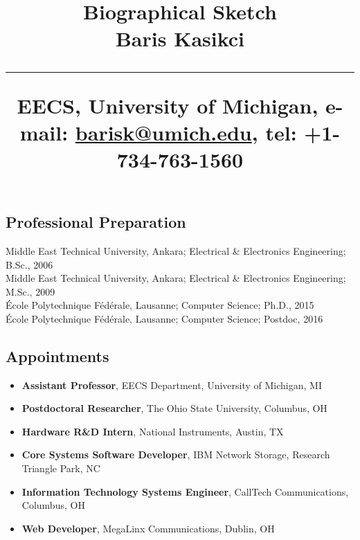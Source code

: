 \documentclass[svgnames,11pt]{article}
\title{%
        \vspace{-2\baselineskip}
            \normalsize
            Biographical Sketch\\
            {\large\textbf{Baris Kasikci}}\\
            \vspace{0.5\baselineskip}
            \hrule
            \vspace{0.5\baselineskip}
            EECS, University of Michigan,
            e-mail: \href{mailto:barisk@umich.edu}{barisk@umich.edu},
            tel: +1-734-763-1560
        \vspace{-1.5ex}
        }
\date{}
\author{}
\begin{document}
\maketitle
\vspace{-4\baselineskip}

\subsection{Professional Preparation}

    Middle East Technical University, Ankara;
        Electrical \& Electronics Engineering;
        B.Sc., 2006
        \\
    Middle East Technical University, Ankara;
        Electrical \& Electronics Engineering;
        M.Sc., 2009
        \\
    \'Ecole Polytechnique F\'ed\'erale, Lausanne;
        Computer Science;
        Ph.D., 2015
        \\
    \'Ecole Polytechnique F\'ed\'erale, Lausanne;
        Computer Science;
        Postdoc, 2016


\subsection{Appointments}

\begin{itemize}[label={--9999:},leftmargin=*,itemsep=0pt]

    \item[2017--present:]
        \textbf{Assistant Professor},
        EECS Department, University of Michigan, MI

    \item[2010--2012:]
        \textbf{Postdoctoral Researcher},
        The Ohio State University,
        Columbus, OH

    \item[2002, 2003:]
        \textbf{Hardware R\&D Intern},
        National Instruments,
        Austin, TX

    \item[2001:]
        \textbf{Core Systems Software Developer},
        IBM Network Storage,
        Research Triangle Park, NC

    \item[1997--2001:]
        \textbf{Information Technology Systems Engineer},
        CallTech Communications,
        Columbus, OH

    \item[1995--1997:]
        \textbf{Web Developer},
        MegaLinx Communications,
        Dublin, OH

\end{itemize}
\end{document}
